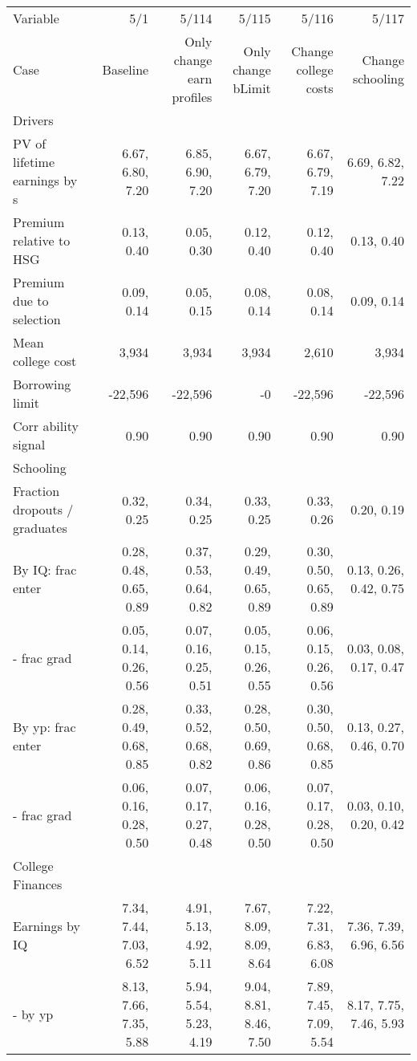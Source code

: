 \begin{tabular}{lrrrrr}
\hline
Variable & 5/1  & 5/114  & 5/115  & 5/116  & 5/117  \\ 
Case & Baseline  & Only change earn profiles  & Only change bLimit  & Change college costs  & Change schooling  \\ 
Drivers &   &   &   &   &   \\ 
PV of lifetime earnings by s & 6.67, 6.80, 7.20  & 6.85, 6.90, 7.20  & 6.67, 6.79, 7.20  & 6.67, 6.79, 7.19  & 6.69, 6.82, 7.22  \\ 
Premium relative to HSG & 0.13, 0.40  & 0.05, 0.30  & 0.12, 0.40  & 0.12, 0.40  & 0.13, 0.40  \\ 
Premium due to selection & 0.09, 0.14  & 0.05, 0.15  & 0.08, 0.14  & 0.08, 0.14  & 0.09, 0.14  \\ 
Mean college cost & 3,934  & 3,934  & 3,934  & 2,610  & 3,934  \\ 
Borrowing limit & -22,596  & -22,596  & -0  & -22,596  & -22,596  \\ 
Corr ability signal & 0.90  & 0.90  & 0.90  & 0.90  & 0.90  \\ 
\hline
Schooling &   &   &   &   &   \\ 
Fraction dropouts / graduates & 0.32, 0.25  & 0.34, 0.25  & 0.33, 0.25  & 0.33, 0.26  & 0.20, 0.19  \\ 
By IQ: frac enter & 0.28, 0.48, 0.65, 0.89  & 0.37, 0.53, 0.64, 0.82  & 0.29, 0.49, 0.65, 0.89  & 0.30, 0.50, 0.65, 0.89  & 0.13, 0.26, 0.42, 0.75  \\ 
- frac grad & 0.05, 0.14, 0.26, 0.56  & 0.07, 0.16, 0.25, 0.51  & 0.05, 0.15, 0.26, 0.55  & 0.06, 0.15, 0.26, 0.56  & 0.03, 0.08, 0.17, 0.47  \\ 
By yp: frac enter & 0.28, 0.49, 0.68, 0.85  & 0.33, 0.52, 0.68, 0.82  & 0.28, 0.50, 0.69, 0.86  & 0.30, 0.50, 0.68, 0.85  & 0.13, 0.27, 0.46, 0.70  \\ 
- frac grad & 0.06, 0.16, 0.28, 0.50  & 0.07, 0.17, 0.27, 0.48  & 0.06, 0.16, 0.28, 0.50  & 0.07, 0.17, 0.28, 0.50  & 0.03, 0.10, 0.20, 0.42  \\ 
\hline
College Finances &   &   &   &   &   \\ 
Earnings by IQ & 7.34, 7.44, 7.03, 6.52  & 4.91, 5.13, 4.92, 5.11  & 7.67, 8.09, 8.09, 8.64  & 7.22, 7.31, 6.83, 6.08  & 7.36, 7.39, 6.96, 6.56  \\ 
- by yp & 8.13, 7.66, 7.35, 5.88  & 5.94, 5.54, 5.23, 4.19  & 9.04, 8.81, 8.46, 7.50  & 7.89, 7.45, 7.09, 5.54  & 8.17, 7.75, 7.46, 5.93  \\ 

\end{tabular}
